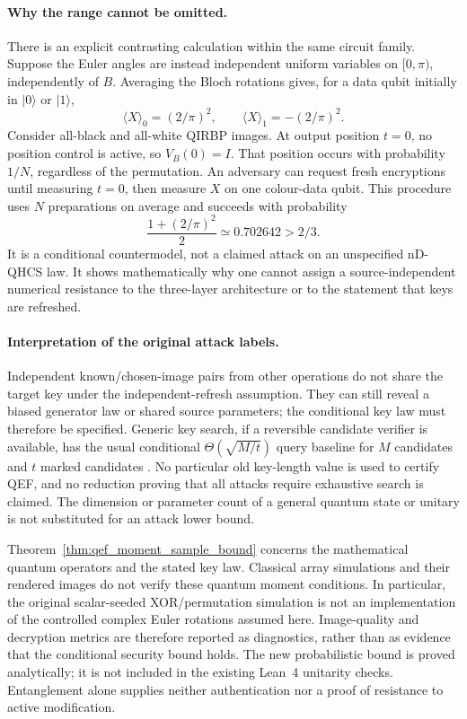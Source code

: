 {\paragraph{Why the range cannot be omitted.}
There is an explicit contrasting calculation within the same circuit
family. Suppose the Euler angles are instead independent uniform
variables on $[0,\pi)$, independently of $B$. Averaging the Bloch
rotations gives, for a data qubit initially in $|0\rangle$ or
$|1\rangle$,
\begin{equation}
 \langle X\rangle_0=(2/\pi)^2,\qquad
 \langle X\rangle_1=-(2/\pi)^2.
\end{equation}
Consider all-black and all-white QIRBP images. At output position
$t=0$, no position control is active, so $V_B(0)=I$. That position
occurs with probability $1/N$, regardless of the permutation.
An adversary can request fresh encryptions until measuring $t=0$,
then measure $X$ on one colour-data qubit. This procedure uses $N$
preparations on average and succeeds with probability
\begin{equation}
 \frac{1+(2/\pi)^2}{2}\simeq0.702642>2/3.
\end{equation}
It is a conditional countermodel, not a claimed attack on an
unspecified nD-QHCS law. It shows mathematically why one cannot
assign a source-independent numerical resistance to the three-layer
architecture or to the statement that keys are refreshed.

\paragraph{Interpretation of the original attack labels.}
Independent known/chosen-image pairs from other operations do not
share the target key under the independent-refresh assumption. They
can still reveal a biased generator law or shared source parameters;
the conditional key law must therefore be specified. Generic key
search, if a reversible candidate verifier is available, has the
usual conditional $\Theta(\sqrt{M/t})$ query baseline for $M$ candidates
and $t$ marked candidates \cite{GDO,Boyer1998QEF,Zalka1999QEF}.
No particular old key-length value is used to certify QEF, and no
reduction proving that all attacks require exhaustive search is
claimed. The dimension or parameter count of a general quantum state
or unitary is not substituted for an attack lower bound.

Theorem~\ref{thm:qef_moment_sample_bound} concerns the mathematical
quantum operators and the stated key law. Classical array simulations
and their rendered images do not verify these quantum moment
conditions. In particular, the original scalar-seeded XOR/permutation
simulation is not an implementation of the controlled complex
Euler rotations assumed here. Image-quality and decryption metrics
are therefore reported as diagnostics, rather than as evidence that
the conditional security bound holds. The new probabilistic bound
is proved analytically; it is not included in the existing Lean~4
unitarity checks. Entanglement alone supplies neither authentication
nor a proof of resistance to active modification.
\par}
